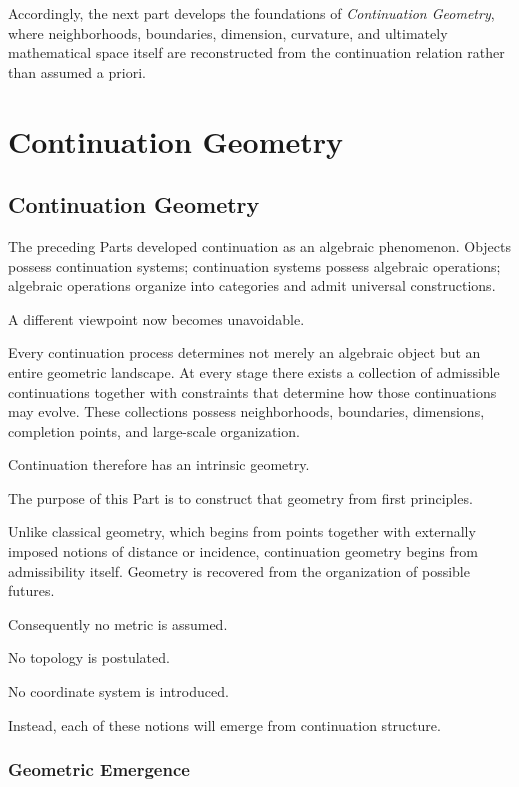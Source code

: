 \documentclass[13pt,openany]{book}
\theoremstyle{plain}
\theoremstyle{definition}
\begin{document}
Accordingly, the next part develops the foundations of
\emph{Continuation Geometry}, where neighborhoods, boundaries, dimension,
curvature, and ultimately mathematical space itself are reconstructed from the
continuation relation rather than assumed a priori.


\part{Continuation Geometry}

\chapter{Continuation Geometry}

The preceding Parts developed continuation as an algebraic phenomenon. Objects possess continuation systems; continuation systems possess algebraic operations; algebraic operations organize into categories and admit universal constructions.

A different viewpoint now becomes unavoidable.

Every continuation process determines not merely an algebraic object but an entire geometric landscape. At every stage there exists a collection of admissible continuations together with constraints that determine how those continuations may evolve. These collections possess neighborhoods, boundaries, dimensions, completion points, and large-scale organization.

Continuation therefore has an intrinsic geometry.

The purpose of this Part is to construct that geometry from first principles.

Unlike classical geometry, which begins from points together with externally imposed notions of distance or incidence, continuation geometry begins from admissibility itself. Geometry is recovered from the organization of possible futures.

Consequently no metric is assumed.

No topology is postulated.

No coordinate system is introduced.

Instead, each of these notions will emerge from continuation structure.


\section{Geometric Emergence}
\end{document}
